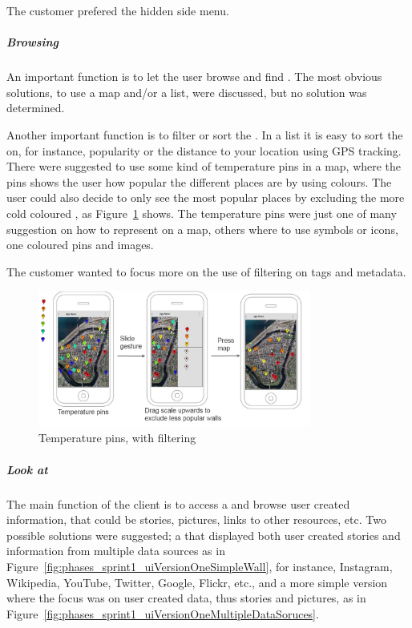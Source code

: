\documentclass[11pt]{book}
\begin{document}
The customer prefered the hidden side menu.

\subparagraph{Browsing \wallentityp}
An important function is to let the user browse and find \wallentityp. The most obvious solutions, to use a map and/or a list, were discussed, but no solution was determined. 

Another important function is to filter or sort the \wallentityp. In a list it is easy to sort the \wallentityp on, for instance, popularity or the distance to your location using GPS tracking. There were suggested to use some kind of temperature pins in a map, where the pins shows the user how popular the different places are by using colours. The user could also decide to only see the most popular places by excluding the more cold coloured \wallentityp, as Figure~\ref{fig:phases_sprint1_uiVersionOneTempPings} shows. The temperature pins were just one of many suggestion on how to represent \wallentityp on a map, others where to use symbols or icons, one coloured pins and images.

The customer wanted to focus more on the use of filtering on tags and metadata.

\begin{figure}[H]
    \centering
    \includegraphics[width=0.8\textwidth]{Figures/Phases/Sprint1/versiononeTempPings.png}
    \caption{Temperature pins, with filtering}
    \label{fig:phases_sprint1_uiVersionOneTempPings}
\end{figure}

\subparagraph{Look at \wallentityp}
The main function of the client is to access a \wallentitys and browse user created information, that could be stories, pictures, links to other resources, etc. Two possible solutions were suggested; a \wallentitys that displayed both user created stories and information from multiple data sources as in Figure~\ref{fig:phases_sprint1_uiVersionOneSimpleWall}, for instance, Instagram, Wikipedia, YouTube, Twitter, Google, Flickr, etc., and a more simple version where the focus was on user created data, thus stories and pictures, as in Figure~\ref{fig:phases_sprint1_uiVersionOneMultipleDataSoruces}. 
\end{document}
